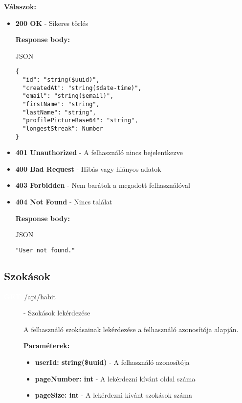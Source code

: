 \documentclass[12pt]{report}
\newcommand{\httpGet}[1]{\colorbox{getColor}{\textbf{\textcolor{white}{GET}}}~#1}
\begin{document}
\begin{itemize}
\begin{description}
    \vspace{0.5cm}
    \textbf{Válaszok:}
    \begin{itemize}
      \item \textbf{200 OK} - Sikeres törlés

        \textbf{Response body:}
        \begin{codeblock}{JSON}
          \begin{verbatim}
{
  "id": "string($uuid)",
  "createdAt": "string($date-time)",
  "email": "string($email)",
  "firstName": "string",
  "lastName": "string",
  "profilePictureBase64": "string",
  "longestStreak": Number
}
          \end{verbatim}
        \end{codeblock}

      \item \textbf{401 Unauthorized} - A felhasználó nincs bejelentkezve

      \item \textbf{400 Bad Request} - Hibás vagy hiányos adatok
      
      \item \textbf{403 Forbidden} - Nem barátok a megadott felhasználóval

      \item \textbf{404 Not Found} - Nincs találat

        \textbf{Response body:}
        \begin{codeblock}{JSON}
          \begin{verbatim}
"User not found."
          \end{verbatim}
        \end{codeblock}
    \end{itemize}
\end{description}

\subsection{Szokások}
\begin{description}
  \item[\httpGet{/api/habit}] - Szokások lekérdezése

    \vspace{0.5cm}
    A felhasználó szokásainak lekérdezése a felhasználó azonosítója alapján.

    \vspace{0.5cm}
    \textbf{Paraméterek:}
    \begin{itemize}
      \item \textbf{userId: string(\$uuid)} - A felhasználó azonosítója
      \item \textbf{pageNumber: int} - A lekérdezni kívánt oldal száma
      \item \textbf{pageSize: int} - A lekérdezni kívánt szokások száma
    \end{itemize}


\end{description}
\end{itemize}
\end{document}
